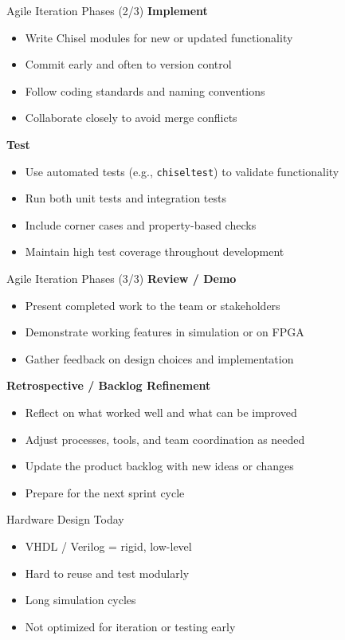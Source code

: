 \begin{frame}{Agile Iteration Phases (2/3)}
\textbf{Implement}
\begin{itemize}
    \item Write Chisel modules for new or updated functionality
    \item Commit early and often to version control
    \item Follow coding standards and naming conventions
    \item Collaborate closely to avoid merge conflicts
\end{itemize}

\medskip
\textbf{Test}
\begin{itemize}
    \item Use automated tests (e.g., \texttt{chiseltest}) to validate functionality
    \item Run both unit tests and integration tests
    \item Include corner cases and property-based checks
    \item Maintain high test coverage throughout development
\end{itemize}
\end{frame}

\begin{frame}{Agile Iteration Phases (3/3)}
\textbf{Review / Demo}
\begin{itemize}
    \item Present completed work to the team or stakeholders
    \item Demonstrate working features in simulation or on FPGA
    \item Gather feedback on design choices and implementation
\end{itemize}

\medskip
\textbf{Retrospective / Backlog Refinement}
\begin{itemize}
    \item Reflect on what worked well and what can be improved
    \item Adjust processes, tools, and team coordination as needed
    \item Update the product backlog with new ideas or changes
    \item Prepare for the next sprint cycle
\end{itemize}
\end{frame}

\begin{frame}{Hardware Design Today}
\begin{itemize}
    \item VHDL / Verilog = rigid, low-level
    \item Hard to reuse and test modularly
    \item Long simulation cycles
    \item Not optimized for iteration or testing early
\end{itemize}
\end{frame}

